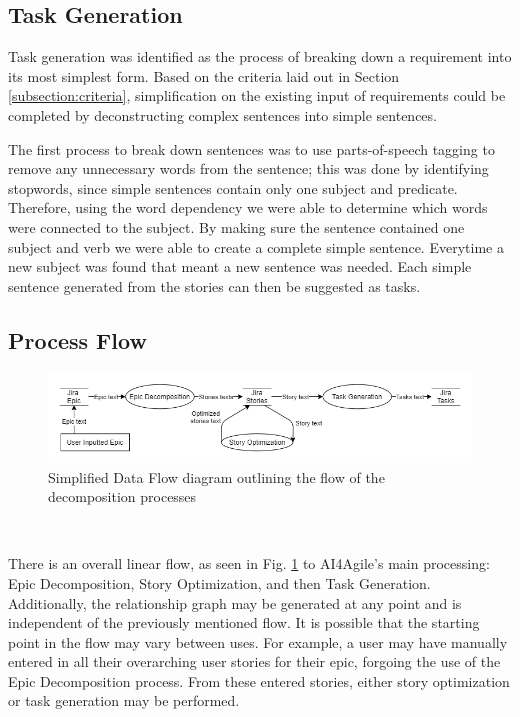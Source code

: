 \subsection{Task Generation}

Task generation was identified as the process of breaking down a requirement into its most simplest form. Based on the criteria laid out in Section \ref{subsection:criteria}, simplification on the existing input of requirements could be completed by deconstructing complex sentences into simple sentences. 

The first process to break down sentences was to use parts-of-speech tagging to remove any unnecessary words from the sentence; this was done by identifying stopwords, since simple sentences contain only one subject and predicate. Therefore, using the word dependency we were able to determine which words were connected to the subject. By making sure the sentence contained one subject and verb we were able to create a complete simple sentence. Everytime a new subject was found that meant a new sentence was needed. Each simple sentence generated from the stories can then be suggested as tasks.

\subsection{Process Flow}

\begin{figure}
\centering
\includegraphics[width=\textwidth,keepaspectratio]{./figure/ExampleDataFlowDiagram.png}
\caption{Simplified Data Flow diagram outlining the flow of the decomposition processes}
\label{fig:ExampleDataFlowDiagram}
\end{figure}\

There is an overall linear flow, as seen in Fig. \ref{fig:ExampleDataFlowDiagram} to AI4Agile’s main processing: Epic Decomposition, Story Optimization, and then Task Generation. Additionally, the relationship graph may be generated at any point and is independent of the previously mentioned flow. It is possible that the starting point in the flow may vary between uses. For example, a user may have manually entered in all their overarching user stories for their epic, forgoing the use of the Epic Decomposition process. From these entered stories, either story optimization or task generation may be performed.

